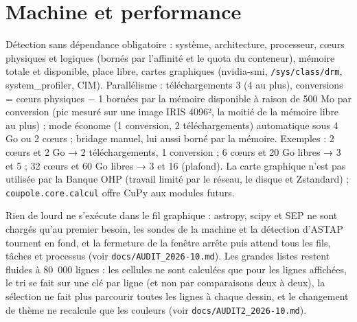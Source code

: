 \section{Machine et performance}
Détection sans dépendance obligatoire : système, architecture, processeur, cœurs physiques et logiques (bornés par
l'affinité et le quota du conteneur), mémoire totale et disponible, place libre, cartes graphiques (nvidia-smi,
\texttt{/sys/class/drm}, system\_profiler, CIM). Parallélisme : téléchargements 3 (4 au plus), conversions = cœurs
physiques − 1 bornées par la mémoire disponible à raison de 500 Mo par conversion (pic mesuré sur une image IRIS
4096², la moitié de la mémoire libre au plus) ; mode économe (1 conversion, 2 téléchargements) automatique sous 4 Go
ou 2 cœurs ; bridage manuel, lui aussi borné par la mémoire. Exemples : 2 cœurs et 2 Go → 2 téléchargements,
1 conversion ; 6 cœurs et 20 Go libres → 3 et 5 ; 32 cœurs et 60 Go libres → 3 et 16 (plafond). La carte
graphique n'est pas utilisée par la Banque OHP (travail limité par le réseau, le disque et Zstandard) ;
\texttt{coupole.core.calcul} offre CuPy aux modules futurs.

Rien de lourd ne s'exécute dans le fil graphique : astropy, scipy et SEP ne sont chargés qu'au premier besoin, les
sondes de la machine et la détection d'ASTAP tournent en fond, et la fermeture de la fenêtre arrête puis attend tous
les fils, tâches et processus (voir \texttt{docs/AUDIT\_2026-10.md}). Les grandes listes restent fluides à 80~000
lignes : les cellules ne sont calculées que pour les lignes affichées, le tri se fait sur une clé par ligne (et non par
comparaisons deux à deux), la sélection ne fait plus parcourir toutes les lignes à chaque dessin, et le changement de
thème ne recalcule que les couleurs (voir \texttt{docs/AUDIT2\_2026-10.md}).


